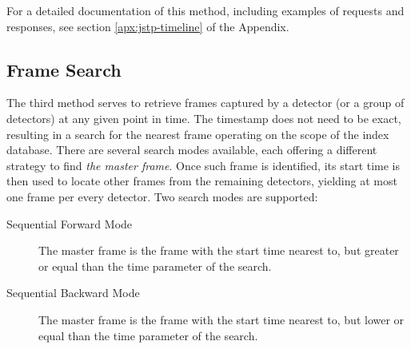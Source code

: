 For a detailed documentation of this method, including examples of requests and responses, see section \ref{apx:jstp-timeline} of the Appendix.

\subsection{Frame Search}
The third method serves to retrieve frames captured by a detector (or a group of detectors) at any given point in time. The timestamp does not need to be exact, resulting in a search for the nearest frame operating on the scope of the index database. There are several search modes available, each offering a different strategy to find \textit{the master frame}. Once such frame is identified, its start time is then used to locate other frames from the remaining detectors, yielding at most one frame per every detector. Two search modes are supported:

\begin{description}
	\item[Sequential Forward Mode]
	The master frame is the frame with the start time nearest to, but greater or equal than the time parameter of the search.

	\item[Sequential Backward Mode]
	The master frame is the frame with the start time nearest to, but lower or equal than the time parameter of the search.

\end{description}



